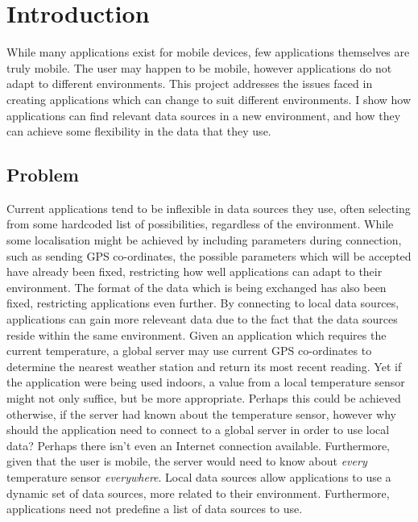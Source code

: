 \documentclass[12pt,twoside,notitlepage]{report}
\begin{document}
\bigskip
\bigskip
{}

\bigskip
\bigskip
{}

\cleardoublepage

\tableofcontents

\listoffigures

\newpage


\cleardoublepage        %

\setcounter{page}{1}
\pagestyle{headings}

\chapter{Introduction}

While many applications exist for mobile devices, few applications themselves are truly mobile. 
The user may happen to be mobile, however applications do not adapt to different environments. 
This project addresses the issues faced in creating applications which can change to suit different environments. 
I show how applications can find relevant data sources in a new environment, and how they can achieve some flexibility in the data that they use. 

\section{Problem}

Current applications tend to be inflexible in data sources they use, often selecting from some hardcoded list of possibilities, regardless of the environment. 
While some localisation might be achieved by including parameters during connection, such as sending GPS co-ordinates, the possible parameters which will be accepted have already been fixed, restricting how well applications can adapt to their environment. 
The format of the data which is being exchanged has also been fixed, restricting applications even further.
By connecting to local data sources, applications can gain more releveant data due to the fact that the data sources reside within the same environment.
Given an application which requires the current temperature, a global server may use current GPS co-ordinates to determine the nearest weather station and return its most recent reading. 
Yet if the application were being used indoors, a value from a local temperature sensor might not only suffice, but be more appropriate. 
Perhaps this could be achieved otherwise, if the server had known about the temperature sensor, however why should the application need to connect to a global server in order to use local data? Perhaps there isn't even an Internet connection available. 
Furthermore, given that the user is mobile, the server would need to know about {\sl every} temperature sensor {\sl everywhere}. 
Local data sources allow applications to use a dynamic set of data sources, more related to their environment. 
Furthermore, applications need not predefine a list of data sources to use.
\end{document}
